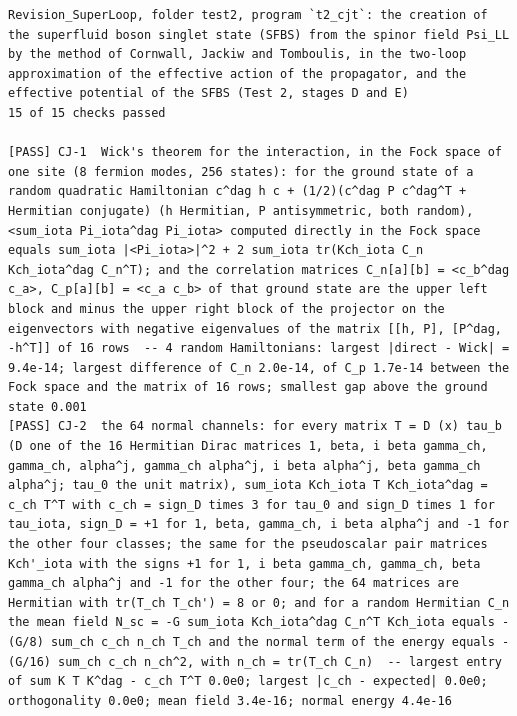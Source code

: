 \documentclass[
  10pt,
]{article}
\begin{document}
\begin{verbatim}
Revision_SuperLoop, folder test2, program `t2_cjt`: the creation of the superfluid boson singlet state (SFBS) from the spinor field Psi_LL by the method of Cornwall, Jackiw and Tomboulis, in the two-loop approximation of the effective action of the propagator, and the effective potential of the SFBS (Test 2, stages D and E)
15 of 15 checks passed

[PASS] CJ-1  Wick's theorem for the interaction, in the Fock space of one site (8 fermion modes, 256 states): for the ground state of a random quadratic Hamiltonian c^dag h c + (1/2)(c^dag P c^dag^T + Hermitian conjugate) (h Hermitian, P antisymmetric, both random), <sum_iota Pi_iota^dag Pi_iota> computed directly in the Fock space equals sum_iota |<Pi_iota>|^2 + 2 sum_iota tr(Kch_iota C_n Kch_iota^dag C_n^T); and the correlation matrices C_n[a][b] = <c_b^dag c_a>, C_p[a][b] = <c_a c_b> of that ground state are the upper left block and minus the upper right block of the projector on the eigenvectors with negative eigenvalues of the matrix [[h, P], [P^dag, -h^T]] of 16 rows  -- 4 random Hamiltonians: largest |direct - Wick| = 9.4e-14; largest difference of C_n 2.0e-14, of C_p 1.7e-14 between the Fock space and the matrix of 16 rows; smallest gap above the ground state 0.001
[PASS] CJ-2  the 64 normal channels: for every matrix T = D (x) tau_b (D one of the 16 Hermitian Dirac matrices 1, beta, i beta gamma_ch, gamma_ch, alpha^j, gamma_ch alpha^j, i beta alpha^j, beta gamma_ch alpha^j; tau_0 the unit matrix), sum_iota Kch_iota T Kch_iota^dag = c_ch T^T with c_ch = sign_D times 3 for tau_0 and sign_D times 1 for tau_iota, sign_D = +1 for 1, beta, gamma_ch, i beta alpha^j and -1 for the other four classes; the same for the pseudoscalar pair matrices Kch'_iota with the signs +1 for 1, i beta gamma_ch, gamma_ch, beta gamma_ch alpha^j and -1 for the other four; the 64 matrices are Hermitian with tr(T_ch T_ch') = 8 or 0; and for a random Hermitian C_n the mean field N_sc = -G sum_iota Kch_iota^dag C_n^T Kch_iota equals -(G/8) sum_ch c_ch n_ch T_ch and the normal term of the energy equals -(G/16) sum_ch c_ch n_ch^2, with n_ch = tr(T_ch C_n)  -- largest entry of sum K T K^dag - c_ch T^T 0.0e0; largest |c_ch - expected| 0.0e0; orthogonality 0.0e0; mean field 3.4e-16; normal energy 4.4e-16

\end{verbatim}
\end{document}
